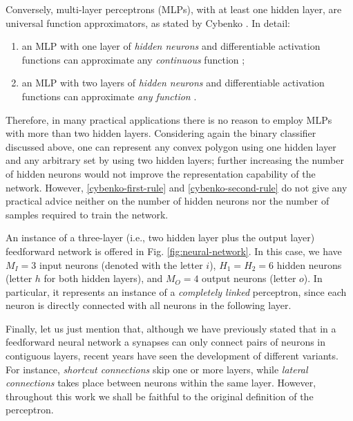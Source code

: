 \documentclass[12pt, a4paper, twoside, openright, notitlepage]{report}
\numberwithin{equation}{chapter}
\theoremstyle{theorem}
\theoremstyle{definition}
\theoremstyle{remark}
\theoremstyle{proposition}
\numberwithin{figure}{chapter}
\begin{document}
		Conversely, multi-layer perceptrons (MLPs), with at least one hidden layer, are universal function approximators, as stated by Cybenko \cite{Cyb88, Cyb89}. In detail:
		\begin{enumerate}[label=(\roman*)]
			\item an MLP with one layer of \emph{hidden neurons} and differentiable activation functions can approximate any \emph{continuous} function \cite{Cyb89};
			\label{cybenko-first-rule}
			\item an MLP with two layers of \emph{hidden neurons} and differentiable activation functions can approximate \emph{any function} \cite{Cyb88}.
			\label{cybenko-second-rule}
		\end{enumerate}
		Therefore, in many practical applications there is no reason to employ MLPs with more than two hidden layers. Considering again the binary classifier discussed above, one can represent any convex polygon using one hidden layer and any arbitrary set by using two hidden layers; further increasing the number of hidden neurons would not improve the representation capability of the network. However, \ref{cybenko-first-rule} and \ref{cybenko-second-rule} do not give any practical advice neither on the number of hidden neurons nor the number of samples required to train the network.
		
		An instance of a three-layer (i.e., two hidden layer plus the output layer) feedforward network is offered in Fig. \ref{fig:neural-network}. In this case, we have $M_I = 3$ input neurons (denoted with the letter $i$), $H_1 = H_2 = 6$ hidden neurons (letter $h$ for both hidden layers), and $M_O = 4$ output neurons (letter $o$). In particular, it represents an instance of a \emph{completely linked} perceptron, since each neuron is directly connected with all neurons in the following layer.
		
		Finally, let us just mention that, although we have previously stated that in a feedforward neural network a synapses can only connect pairs of neurons in contiguous layers, recent years have seen the development of different variants. For instance, \emph{shortcut connections} skip one or more layers, while \emph{lateral connections} takes place between neurons within the same layer. However, throughout this work we shall be faithful to the original definition of the perceptron.
				
		\vspace*{0.3cm}
		
\end{document}
